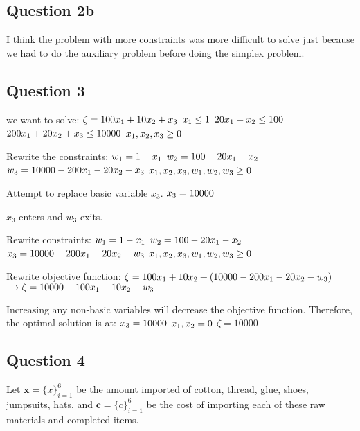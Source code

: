 \documentclass[17pt]{extarticle}
\begin{document}
\newpage
\subsection*{Question 2b}
I think the problem with more constraints was more difficult to solve just because we had to do the auxiliary problem before doing the simplex problem.

\newpage
\subsection*{Question 3}
we want to solve:
$\\ \zeta = 100x_1 + 10x_2 + x_3$
$\\ x_1 \leq 1$
$\\ 20x_1 + x_2 \leq 100$
$\\ 200x_1 + 20x_2 + x_3 \leq 10000$
$\\ x_1, x_2, x_3 \geq 0$

\bigskip Rewrite the constraints:
$\\ w_1 = 1 - x_1$
$\\ w_2 = 100 - 20x_1 - x_2$
$\\ w_3 = 10000 - 200x_1 - 20x_2 - x_3$
$\\ x_1, x_2, x_3, w_1, w_2, w_3 \geq 0$

\bigskip Attempt to replace basic variable $x_3$.
$\\ x_3 = 10000$

\bigskip $x_3$ enters and $w_3$ exits.

\bigskip Rewrite constraints:
$\\ w_1 = 1 - x_1$
$\\ w_2 = 100 - 20x_1 - x_2$
$\\ x_3 = 10000 - 200x_1 - 20x_2 - w_3$
$\\ x_1, x_2, x_3, w_1, w_2, w_3 \geq 0$

\bigskip Rewrite objective function:
$\\\zeta = 100x_1 + 10x_2 + (10000 - 200x_1 - 20x_2 - w_3)$
$\\\to \zeta = 10000 - 100x_1 - 10x_2 - w_3$

\bigskip Increasing any non-basic variables will decrease the objective function. Therefore, the optimal solution is at:
$\\ x_3 = 10000$
$\\ x_1, x_2 = 0$
$\zeta = 10000$

\newpage
\subsection*{Question 4}
Let $\textbf{x} = \{x\}_{i=1}^6$ be the amount imported of cotton, thread, glue, shoes, jumpsuits, hats, and $\textbf{c} = \{c\}_{i=1}^6$ be the cost of importing each of these raw materials and completed items.
\end{document}
